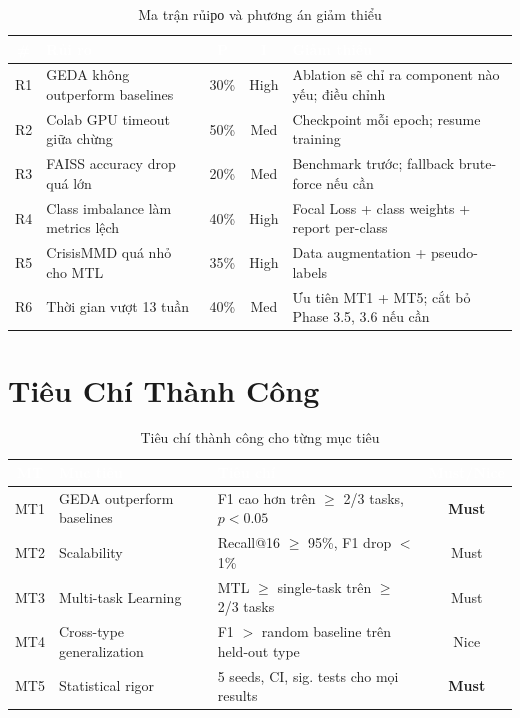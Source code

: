 \documentclass[12pt,a4paper]{article}
\begin{document}
\begin{table}[H]
\centering
\caption{Ma trận rủiро và phương án giảm thiểu}
\begin{tabularx}{\textwidth}{c X c c X}
\toprule
\rowcolor{tableheader}
\textcolor{white}{\#} & \textcolor{white}{\textbf{Rủi ro}} & \textcolor{white}{\textbf{P}} & \textcolor{white}{\textbf{I}} & \textcolor{white}{\textbf{Giảm thiểu}} \\
\midrule
R1 & GEDA không outperform baselines & 30\% & High & Ablation sẽ chỉ ra component nào yếu; điều chỉnh \\
R2 & Colab GPU timeout giữa chừng & 50\% & Med & Checkpoint mỗi epoch; resume training \\
R3 & FAISS accuracy drop quá lớn & 20\% & Med & Benchmark trước; fallback brute-force nếu cần \\
R4 & Class imbalance làm metrics lệch & 40\% & High & Focal Loss + class weights + report per-class \\
R5 & CrisisMMD quá nhỏ cho MTL & 35\% & High & Data augmentation + pseudo-labels \\
R6 & Thời gian vượt 13 tuần & 40\% & Med & Ưu tiên MT1 + MT5; cắt bỏ Phase 3.5, 3.6 nếu cần \\
\bottomrule
\end{tabularx}
\end{table}

\section{Tiêu Chí Thành Công}

\begin{table}[H]
\centering
\caption{Tiêu chí thành công cho từng mục tiêu}
\begin{tabularx}{\textwidth}{c X X c}
\toprule
\rowcolor{tableheader}
\textcolor{white}{\textbf{MT}} & \textcolor{white}{\textbf{Mục tiêu}} & \textcolor{white}{\textbf{Tiêu chí}} & \textcolor{white}{\textbf{Must/Nice}} \\
\midrule
MT1 & GEDA outperform baselines & F1 cao hơn trên $\geq$ 2/3 tasks, $p < 0.05$ & \textbf{Must} \\
MT2 & Scalability & Recall@16 $\geq$ 95\%, F1 drop $<$ 1\% & Must \\
MT3 & Multi-task Learning & MTL $\geq$ single-task trên $\geq$ 2/3 tasks & Must \\
MT4 & Cross-type generalization & F1 $>$ random baseline trên held-out type & Nice \\
MT5 & Statistical rigor & 5 seeds, CI, sig. tests cho mọi results & \textbf{Must} \\
\bottomrule
\end{tabularx}
\end{table}
\end{document}
